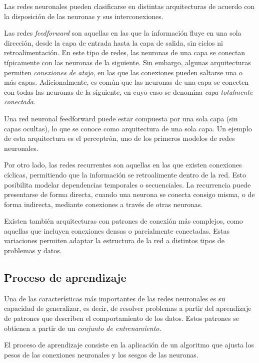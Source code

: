 Las redes neuronales pueden clasificarse en distintas arquitecturas de acuerdo con la
disposición de las neuronas y sus interconexiones.
\medskip

Las redes \textit{feedforward} son aquellas en las que la información fluye en una sola
dirección, desde la capa de entrada hasta la capa de salida, sin ciclos ni retroalimentación.
En este tipo de redes, las neuronas de una capa se conectan típicamente con las neuronas
de la siguiente. Sin embargo, algunas arquitecturas permiten \textit{conexiones de atajo},
en las que las conexiones pueden saltarse una o más capas. Adicionalmente, es común que
las neuronas de una capa se conecten con todas las neuronas de la siguiente, en cuyo caso
se denomina \textit{capa totalmente conectada}.
\medskip

Una red neuronal feedforward puede estar compuesta por una sola capa (sin capas ocultas),
lo que se conoce como arquitectura de una sola capa. Un ejemplo de esta arquitectura es
el perceptrón, uno de los primeros modelos de redes neuronales.
\medskip

Por otro lado, las redes recurrentes son aquellas en las que existen conexiones cíclicas,
permitiendo que la información se retroalimente dentro de la red. Esto posibilita modelar
dependencias temporales o secuenciales. La recurrencia puede presentarse de forma directa,
cuando una neurona se conecta consigo misma, o de forma indirecta, mediante conexiones
a través de otras neuronas.
\medskip

Existen también arquitecturas con patrones de conexión más complejos, como aquellas que
incluyen conexiones densas o parcialmente conectadas. Estas variaciones permiten adaptar
la estructura de la red a distintos tipos de problemas y datos.

\subsection{Proceso de aprendizaje}
Una de las características más importantes de las redes neuronales es su capacidad
de generalizar, es decir, de resolver problemas a partir del aprendizaje de patrones
que describen el comportamiento de los datos. Estos patrones se obtienen a partir
de un \textit{conjunto de entrenamiento}.

El proceso de aprendizaje consiste en la aplicación de un algoritmo que ajusta los
pesos de las conexiones neuronales y los sesgos de las neuronas.

